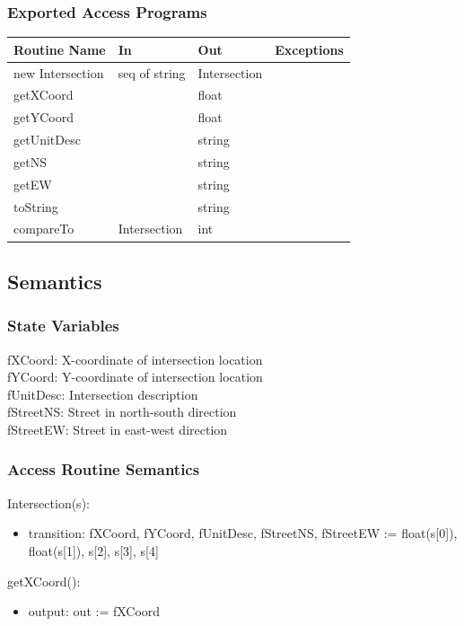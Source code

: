 \documentclass[12pt]{article}
\begin{document}
\subsubsection*{Exported Access Programs}
    \begin{tabular}{|l|l|l|l|}
    \hline
    \textbf{Routine Name} & \textbf{In} & \textbf{Out} & \textbf{Exceptions}\\
    \hline
    new Intersection & seq of string & Intersection & ~\\
    \hline
    getXCoord & ~ & float & ~\\
    \hline
    getYCoord & ~ & float & ~\\
    \hline
    getUnitDesc & ~ & string & ~\\
    \hline
    getNS & ~ & string & ~\\
    \hline
    getEW & ~ & string & ~\\
    \hline
    toString & ~ & string & ~\\
    \hline
    compareTo & Intersection & int & ~\\
    \hline
    \end{tabular}
    
\subsection*{Semantics}
\subsubsection*{State Variables}
fXCoord: X-coordinate of intersection location\\
fYCoord: Y-coordinate of intersection location\\
fUnitDesc: Intersection description\\
fStreetNS: Street in north-south direction\\
fStreetEW: Street in east-west direction

\subsubsection*{Access Routine Semantics}

\noindent Intersection(s):
\begin{itemize}
    \item transition: fXCoord, fYCoord, fUnitDesc, fStreetNS, fStreetEW := float(s[0]), float(s[1]), s[2], s[3], s[4]
\end{itemize}

\noindent getXCoord():
\begin{itemize}
    \item output: out := fXCoord
\end{itemize}
\end{document}
